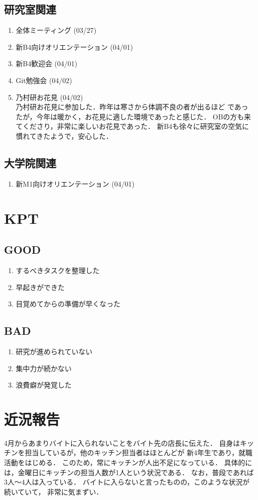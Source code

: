 \documentclass[fleqn, 14pt]{extarticle}
\begin{document}
  \subsection{研究室関連}
  \begin{enumerate}
   \item 全体ミーティング
         \hfill
         (03/27)
   \item 新B4向けオリエンテーション
         \hfill
         (04/01)
     \item 新B4歓迎会
         \hfill
         (04/01)
     \item Git勉強会
         \hfill
         (04/02)
     \item 乃村研お花見
         \hfill
         (04/02)\\
         乃村研お花見に参加した．昨年は寒さから体調不良の者が出るほど
         であったが，今年は暖かく，お花見に適した環境であったと感じた．
         OBの方も来てくださり，非常に楽しいお花見であった．
         新B4も徐々に研究室の空気に慣れてきたようで，安心した．

  \end{enumerate}

  \subsection{大学院関連}
  \begin{enumerate}
   \item 新M1向けオリエンテーション
         \hfill
         (04/01)
  \end{enumerate}

\section{KPT}
  \subsection{GOOD}
  \begin{enumerate}
   \item するべきタスクを整理した
   \item 早起きができた
   \item 目覚めてからの準備が早くなった
  \end{enumerate}

  \subsection{BAD}
  \begin{enumerate}
   \item 研究が進められていない
   \item 集中力が続かない
   \item 浪費癖が発覚した
  \end{enumerate}

\section{近況報告}
4月からあまりバイトに入られないことをバイト先の店長に伝えた．
自身はキッチンを担当しているが，他のキッチン担当者はほとんどが
新4年生であり，就職活動をはじめる．
このため，常にキッチンが人出不足になっている．
具体的には，金曜日にキッチンの担当人数が1人という状況である．
なお，普段であれば3人〜4人は入っている．
バイトに入らないと言ったものの，このような状況が続いていて，
非常に気まずい．
\end{document}
